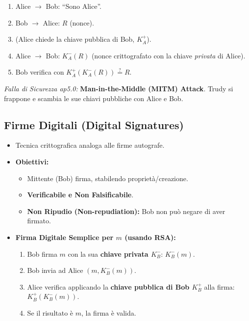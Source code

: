 \begin{itemize}
\begin{enumerate}
        \item Alice $\rightarrow$ Bob: \textquotedblleft Sono Alice\textquotedblright{}.
        \item Bob $\rightarrow$ Alice: $R$ (nonce).
        \item (Alice chiede la chiave pubblica di Bob, $K_A^+$).
        \item Alice $\rightarrow$ Bob: $K_A^-(R)$ (nonce crittografato con la chiave \textit{privata} di Alice).
        \item Bob verifica con $K_A^+(K_A^-(R)) \stackrel{?}{=} R$.
    \end{enumerate}
    \textit{Falla di Sicurezza ap5.0:} \textbf{Man-in-the-Middle (MITM) Attack}. Trudy si frappone e scambia le sue chiavi pubbliche con Alice e Bob.
\end{itemize}

\subsection{Firme Digitali (Digital Signatures)}
\begin{itemize}
    \item Tecnica crittografica analoga alle firme autografe.
    \item \textbf{Obiettivi:}
    \begin{itemize}
        \item Mittente (Bob) firma, stabilendo proprietà/creazione.
        \item \textbf{Verificabile e Non Falsificabile}.
        \item \textbf{Non Ripudio (Non-repudiation):} Bob non può negare di aver firmato.
    \end{itemize}
    \item \textbf{Firma Digitale Semplice per $m$ (usando RSA):}
    \begin{enumerate}
        \item Bob firma $m$ con la sua \textbf{chiave privata $K_B^-$}: $K_B^-(m)$.
        \item Bob invia ad Alice $(m, K_B^-(m))$.
        \item Alice verifica applicando la \textbf{chiave pubblica di Bob $K_B^+$} alla firma: $K_B^+(K_B^-(m))$.
        \item Se il risultato è $m$, la firma è valida.
    \end{enumerate}
\end{itemize}

